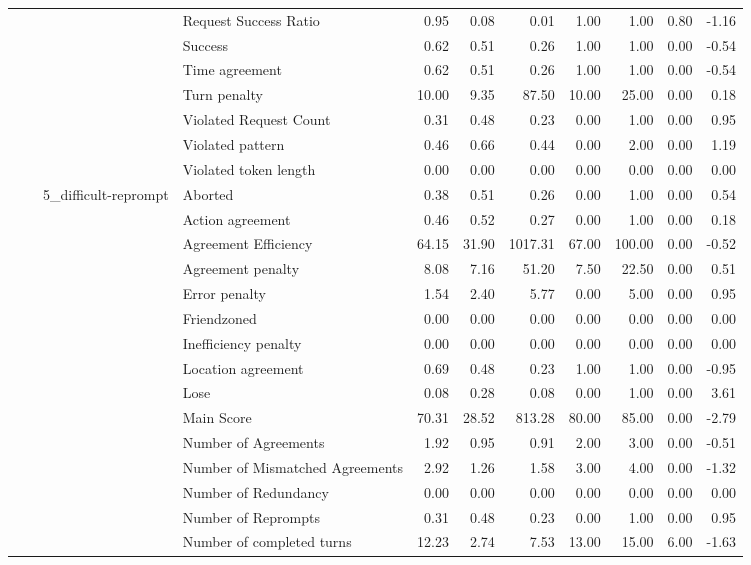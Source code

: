 \begin{tabular}{llllrrrrrrr}
 &  &  & Request Success Ratio & 0.95 & 0.08 & 0.01 & 1.00 & 1.00 & 0.80 & -1.16 \\
 &  &  & Success & 0.62 & 0.51 & 0.26 & 1.00 & 1.00 & 0.00 & -0.54 \\
 &  &  & Time agreement & 0.62 & 0.51 & 0.26 & 1.00 & 1.00 & 0.00 & -0.54 \\
 &  &  & Turn penalty & 10.00 & 9.35 & 87.50 & 10.00 & 25.00 & 0.00 & 0.18 \\
 &  &  & Violated Request Count & 0.31 & 0.48 & 0.23 & 0.00 & 1.00 & 0.00 & 0.95 \\
 &  &  & Violated pattern & 0.46 & 0.66 & 0.44 & 0.00 & 2.00 & 0.00 & 1.19 \\
 &  &  & Violated token length & 0.00 & 0.00 & 0.00 & 0.00 & 0.00 & 0.00 & 0.00 \\
\cline{3-11}
 &  & \multirow[t]{27}{*}{5_difficult-reprompt} & Aborted & 0.38 & 0.51 & 0.26 & 0.00 & 1.00 & 0.00 & 0.54 \\
 &  &  & Action agreement & 0.46 & 0.52 & 0.27 & 0.00 & 1.00 & 0.00 & 0.18 \\
 &  &  & Agreement Efficiency & 64.15 & 31.90 & 1017.31 & 67.00 & 100.00 & 0.00 & -0.52 \\
 &  &  & Agreement penalty & 8.08 & 7.16 & 51.20 & 7.50 & 22.50 & 0.00 & 0.51 \\
 &  &  & Error penalty & 1.54 & 2.40 & 5.77 & 0.00 & 5.00 & 0.00 & 0.95 \\
 &  &  & Friendzoned & 0.00 & 0.00 & 0.00 & 0.00 & 0.00 & 0.00 & 0.00 \\
 &  &  & Inefficiency penalty & 0.00 & 0.00 & 0.00 & 0.00 & 0.00 & 0.00 & 0.00 \\
 &  &  & Location agreement & 0.69 & 0.48 & 0.23 & 1.00 & 1.00 & 0.00 & -0.95 \\
 &  &  & Lose & 0.08 & 0.28 & 0.08 & 0.00 & 1.00 & 0.00 & 3.61 \\
 &  &  & Main Score & 70.31 & 28.52 & 813.28 & 80.00 & 85.00 & 0.00 & -2.79 \\
 &  &  & Number of Agreements & 1.92 & 0.95 & 0.91 & 2.00 & 3.00 & 0.00 & -0.51 \\
 &  &  & Number of Mismatched Agreements & 2.92 & 1.26 & 1.58 & 3.00 & 4.00 & 0.00 & -1.32 \\
 &  &  & Number of Redundancy & 0.00 & 0.00 & 0.00 & 0.00 & 0.00 & 0.00 & 0.00 \\
 &  &  & Number of Reprompts & 0.31 & 0.48 & 0.23 & 0.00 & 1.00 & 0.00 & 0.95 \\
 &  &  & Number of completed turns & 12.23 & 2.74 & 7.53 & 13.00 & 15.00 & 6.00 & -1.63 \\

\end{tabular}

